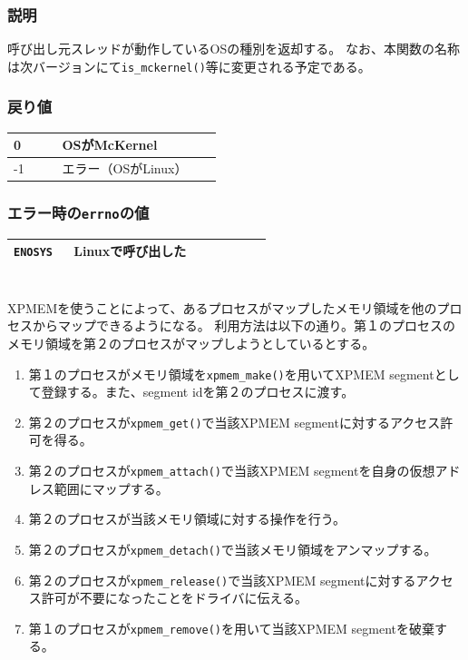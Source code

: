 \documentclass[twoside,11pt,fleqn]{book}
\begin{document}
\subsubsection*{説明}{\quad}
呼び出し元スレッドが動作しているOSの種別を返却する。
なお、本関数の名称は次バージョンにて\texttt{is\_mckernel()}等に変更される予定である。

\subsubsection*{戻り値}
\begin{table}[!ht]
\footnotesize
\begin{tabular}{|p{0.20\linewidth}|p{0.66\linewidth}|} \hline
0&OSがMcKernel\\ \hline
-1&エラー（OSがLinux）\\ \hline
\end{tabular}
\vspace{-0em}
\end{table}
\FloatBarrier

\subsubsection*{エラー時の\texttt{errno}の値}{\quad}
\begin{table}[!ht]
\footnotesize
\begin{tabular}{|p{0.20\linewidth}|p{0.66\linewidth}|} \hline
\texttt{ENOSYS}&Linuxで呼び出した\\ \hline
\end{tabular}
\vspace{-0em}
\end{table}
\FloatBarrier


\section{}\label{sec:xpmem_libif}
XPMEMを使うことによって、あるプロセスがマップしたメモリ領域を他のプロセスからマップできるようになる。
利用方法は以下の通り。第１のプロセスのメモリ領域を第２のプロセスがマップしようとしているとする。
\begin{enumerate}
\item 第１のプロセスがメモリ領域を\texttt{xpmem\_make()}を用いてXPMEM segmentとして登録する。また、segment idを第２のプロセスに渡す。
\item 第２のプロセスが\texttt{xpmem\_get()}で当該XPMEM segmentに対するアクセス許可を得る。
\item 第２のプロセスが\texttt{xpmem\_attach()}で当該XPMEM segmentを自身の仮想アドレス範囲にマップする。
\item 第２のプロセスが当該メモリ領域に対する操作を行う。
\item 第２のプロセスが\texttt{xpmem\_detach()}で当該メモリ領域をアンマップする。
\item 第２のプロセスが\texttt{xpmem\_release()}で当該XPMEM segmentに対するアクセス許可が不要になったことをドライバに伝える。
\item 第１のプロセスが\texttt{xpmem\_remove()}を用いて当該XPMEM segmentを破棄する。
\end{enumerate}
\end{document}
